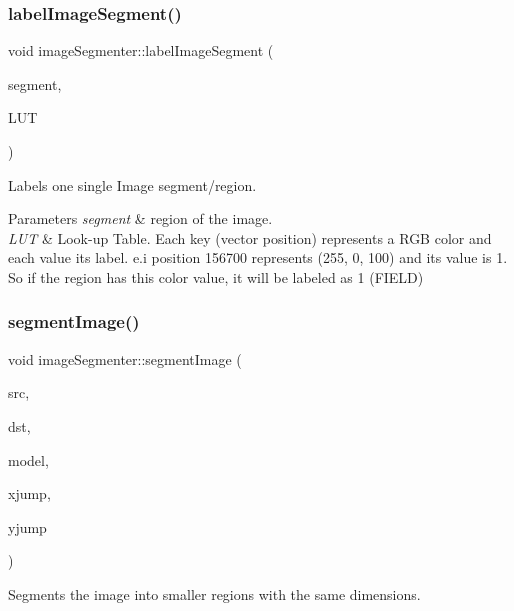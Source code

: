 \subsubsection{\texorpdfstring{label\+Image\+Segment()}{label_image_segment()}}
{\footnotesize\ttfamily void image\+Segmenter\+::label\+Image\+Segment (\begin{DoxyParamCaption}\item[{\hyperlink{class_image_region}{Image\+Region} \&}]{segment,  }\item[{std\+::vector$<$ uint8\+\_\+t $>$ \&}]{L\+UT }\end{DoxyParamCaption})}



Labels one single Image segment/region. 


\begin{DoxyParams}{Parameters}
{\em segment} & region of the image. \\
\hline
{\em L\+UT} & Look-\/up Table. Each key (vector position) represents a R\+GB color and each value its label. e.\+i position 156700 represents (255, 0, 100) and its value is 1. So if the region has this color value, it will be labeled as 1 (F\+I\+E\+LD) \\
\hline
\end{DoxyParams}
\mbox{\label{classimage_segmenter_ae290d94539d650dff3f0d870319941a8}} 
\subsubsection{\texorpdfstring{segment\+Image()}{segment_image()}}
{\footnotesize\ttfamily void image\+Segmenter\+::segment\+Image (\begin{DoxyParamCaption}\item[{cv\+::\+Mat \&}]{src,  }\item[{cv\+::\+Mat \&}]{dst,  }\item[{cv\+::\+Mat\+\_\+$<$ \hyperlink{class_image_region}{Image\+Region} $>$ \&}]{model,  }\item[{int}]{xjump,  }\item[{int}]{yjump }\end{DoxyParamCaption})}



Segments the image into smaller regions with the same dimensions. 

